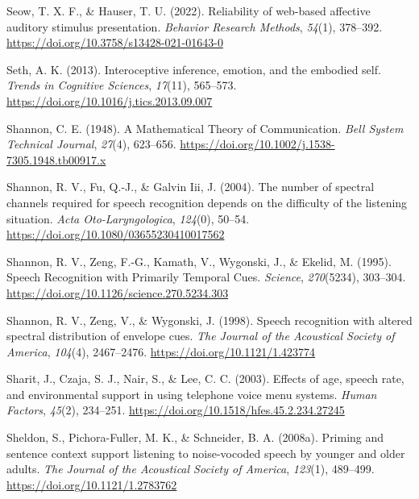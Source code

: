 \documentclass[a4paper, nobind]{templates/ociamthesis}
\newlength{\cslhangindent}
\newenvironment{CSLReferences}[2] %
 {%
  \setlength{\parindent}{0pt}
  \ifodd #1
  \let\oldpar\par
  \def\par{\hangindent=\cslhangindent\oldpar}
  \fi
  \setlength{\parskip}{1mm}
  \setlength{\baselineskip}{6mm}
 }%
 {}
\begin{document}
\begin{CSLReferences}{1}{0}
\leavevmode{}%
Seow, T. X. F., \& Hauser, T. U. (2022). {Reliability of web-based affective auditory stimulus presentation}. \emph{Behavior Research Methods}, \emph{54}(1), 378--392. \url{https://doi.org/10.3758/s13428-021-01643-0}

\leavevmode{}%
Seth, A. K. (2013). Interoceptive inference, emotion, and the embodied self. \emph{Trends in Cognitive Sciences}, \emph{17}(11), 565--573. \url{https://doi.org/10.1016/j.tics.2013.09.007}

\leavevmode{}%
Shannon, C. E. (1948). A Mathematical Theory of Communication. \emph{Bell System Technical Journal}, \emph{27}(4), 623--656. \url{https://doi.org/10.1002/j.1538-7305.1948.tb00917.x}

\leavevmode{}%
Shannon, R. V., Fu, Q.-J., \& Galvin Iii, J. (2004). {The number of spectral channels required for speech recognition depends on the difficulty of the listening situation}. \emph{Acta Oto-Laryngologica}, \emph{124}(0), 50--54. \url{https://doi.org/10.1080/03655230410017562}

\leavevmode{}%
Shannon, R. V., Zeng, F.-G., Kamath, V., Wygonski, J., \& Ekelid, M. (1995). Speech Recognition with Primarily Temporal Cues. \emph{Science}, \emph{270}(5234), 303--304. \url{https://doi.org/10.1126/science.270.5234.303}

\leavevmode{}%
Shannon, R. V., Zeng, V., \& Wygonski, J. (1998). Speech recognition with altered spectral distribution of envelope cues. \emph{The Journal of the Acoustical Society of America}, \emph{104}(4), 2467--2476. \url{https://doi.org/10.1121/1.423774}

\leavevmode{}%
Sharit, J., Czaja, S. J., Nair, S., \& Lee, C. C. (2003). {Effects of age, speech rate, and environmental support in using telephone voice menu systems}. \emph{Human Factors}, \emph{45}(2), 234--251. \url{https://doi.org/10.1518/hfes.45.2.234.27245}

\leavevmode{}%
Sheldon, S., Pichora-Fuller, M. K., \& Schneider, B. A. (2008a). Priming and sentence context support listening to noise-vocoded speech by younger and older adults. \emph{The Journal of the Acoustical Society of America}, \emph{123}(1), 489--499. \url{https://doi.org/10.1121/1.2783762}


\end{CSLReferences}
\end{document}
